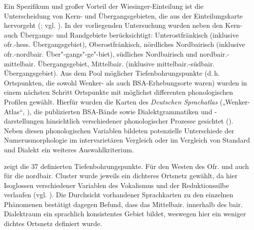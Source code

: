 Ein Spezifikum und großer Vorteil der Wiesinger-Einteilung ist die Unterscheidung von Kern- und Übergangsgebieten, die aus der Einteilungskarte hervorgeht (\citealt[830f. und Karte 47.4]{Wiesinger1983b}; vgl. \citealt[188--189]{Lameli2019}). In der vorliegenden Untersuchung wurden neben den Kern- auch Übergangs- und Randgebiete berücksichtigt: Unterostfränkisch (inklusive ofr.-hess. Übergangsgebiet), Oberostfränkisch, nördliches Nordbairisch (inklusive ofr.-nordbair. Über"-gangs"-ge"-biet), südliches Nordbairisch und nordbair.-mittelbair. Übergangsgebiet, Mittelbair. (inklusive mittelbair.-südbair. Übergangsgebiet). Aus dem Pool möglicher Tiefenbohrungspunkte (d.\,h. Ortspunkten, die sowohl Wenker- als auch BSA-Erhebungsorte waren) wurden in einem nächsten Schritt Ortspunkte mit möglichst differenten phonologischen Profilen gewählt. Hierfür wurden die Karten des \textit{Deutschen Sprachatlas} („Wenker-Atlas“, \citealt{WA}), die publizierten BSA-Bände sowie Dialektgrammatiken und -darstellungen hinsichtlich verschiedener phonologischer Prozesse gesichtet (). Neben diesen phonologischen Variablen bildeten potenzielle Unterschiede der Numerusmorphologie im intervarietären Vergleich oder im Vergleich von Standard und Dialekt ein weiteres Auswahlkriterium.


 zeigt die 37 definierten Tiefenbohrungspunkte. Für den Westen des Ofr. und auch für die nordbair. Cluster wurde jeweils ein dichteres Ortsnetz gewählt, da hier Isoglossen verschiedener Variablen des Vokalismus und der Reduktionssilbe verlaufen (vgl. \citealt[399]{Rowley1990a}). Die Durchsicht vorhandener Sprachkarten zu den einzelnen Phänomenen bestätigt dagegen  Befund, dass das Mittelbair. innerhalb des bair. Dialektraum ein sprachlich konsistentes Gebiet bildet, weswegen hier ein weniger dichtes Ortsnetz definiert wurde.\largerpage

